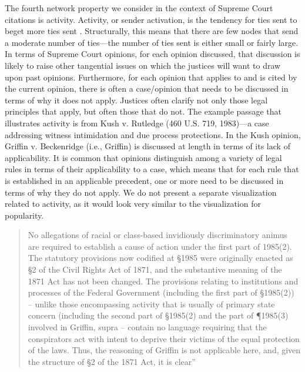 \documentclass[headsepline=true, abstracton]{scrartcl}
\begin{document}
The fourth network property we consider in the context of Supreme Court citations is activity. Activity, or sender activation, is the tendency for ties sent to beget more ties sent \citep{howard2016understanding}. Structurally, this means that there are few nodes that send a moderate number of ties---the number of ties sent is either small or fairly large. In terms of Supreme Court opinions, for each opinion discussed, that discussion is likely to raise other tangential issues on which the justices will want to draw upon past opinions.  Furthermore, for each opinion that applies to and is cited by the current opinion, there is often a case/opinion that needs to be discussed in terms of why it does not apply. Justices often clarify not only those legal principles that apply, but often those that do not. The example passage that illustrates activity is from Kush v. Rutledge (460 U.S. 719, 1983)---a case addressing witness intimidation and due process protections. In the Kush opinion, Griffin v. Beckenridge (i.e., Griffin) is discussed at length in terms of its lack of applicability. It is common that opinions distinguish among a variety of legal rules in terms of their applicability to a case, which means that for each rule that is established in an applicable precedent, one or more need to be discussed in terms of why they do not apply. We do not present a separate visualization related to activity, as it would look very similar to the visualization for popularity.
\begin{quotation}
No allegations of racial or class-based invidiously discriminatory animus are required to establish a cause of action under the first part of 1985(2). The statutory provisions now codified at \S 1985 were originally enacted as \S 2 of the Civil Rights Act of 1871, and the substantive meaning of the 1871 Act has not been changed. The provisions relating to institutions and processes of the Federal Government (including the first part of \S 1985(2)) -- unlike those encompassing activity that is usually of primary state concern (including the second part of \S 1985(2) and the part of \P 1985(3) involved in Griffin, supra -- contain no language requiring that the conspirators act with intent to deprive their victims of the equal protection of the laws. Thus, the reasoning of Griffin is not applicable here, and, given the structure of \S 2 of the 1871 Act, it is clear''
\end{quotation} %
\end{document}
